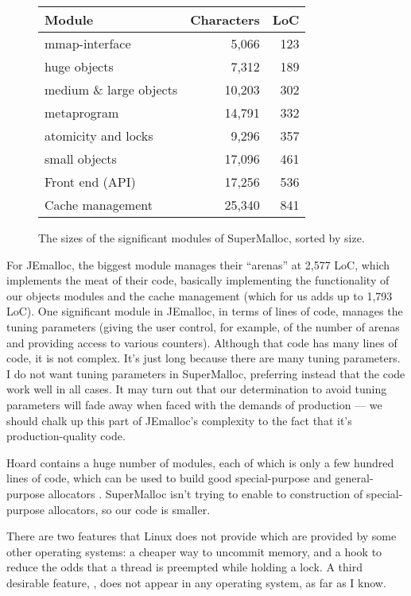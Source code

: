 \documentclass[natbib,sort&compress,10pt]{sigplanconf}
\begin{document}
\begin{figure}
\begin{center}
\begin{tabular}{lrr}
Module & Characters & LoC \\ \hline
mmap-interface         &   5,066 &  123 \\        
huge objects           &   7,312 &  189 \\
medium \& large objects&  10,203 &  302 \\
metaprogram            &  14,791 &  332 \\
atomicity and locks    &   9,296 &  357 \\
small objects          &  17,096 &  461 \\
Front end (API)        &  17,256 &  536 \\
Cache management       &  25,340 &  841 \\
\end{tabular}
\end{center}
\caption{The sizes of the significant modules of SuperMalloc, sorted by size.}
\label{fig:supermodules}
\end{figure}

For JEmalloc, the biggest module manages their ``arenas'' at 2,577
LoC, which implements the meat of their code, basically implementing
the functionality of our objects modules and the cache management
(which for us adds up to 1,793 LoC).  One significant module in
JEmalloc, in terms of lines of code, manages the tuning parameters
(giving the user control, for example, of the number of arenas and
providing access to various counters).  Although that code has many
lines of code, it is not complex.  It's just long because there are
many tuning parameters.  I do not want tuning parameters in
SuperMalloc, preferring instead that the code work well in all cases.
It may turn out that our determination to avoid tuning parameters will
fade away when faced with the demands of production --- we should
chalk up this part of JEmalloc's complexity to the fact that it's
production-quality code.

Hoard contains a huge number of modules, each of which is only a few
hundred lines of code, which can be used to build good special-purpose
and general-purpose allocators \cite{AlexandrescuBe05}.  SuperMalloc
isn't trying to enable to construction of special-purpose allocators,
so our code is smaller.


There are two features that Linux does not provide which are provided
by some other operating systems: a cheaper way to uncommit memory, and
a hook to reduce the odds that a thread is preempted while holding a
lock.  A third desirable feature, , does
not appear in any operating system, as far as I know.
\end{document}
